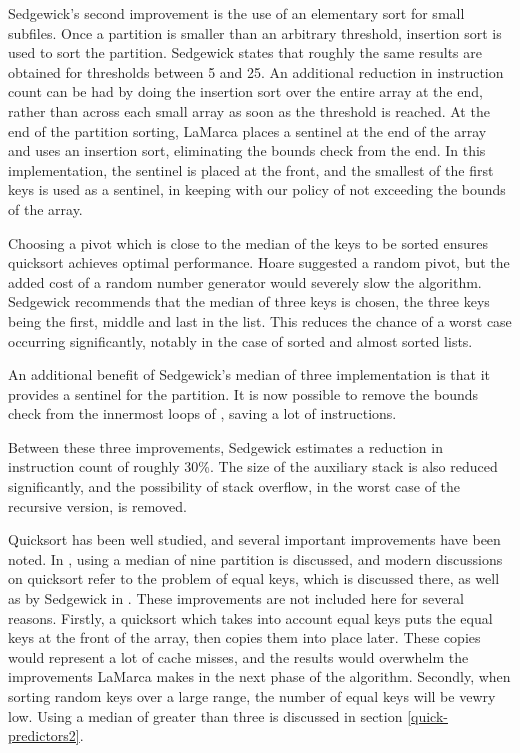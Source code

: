 Sedgewick's second improvement is the use of an elementary sort for small
subfiles.  Once a partition is smaller than an arbitrary threshold, insertion
sort is used to sort the partition. Sedgewick states that roughly the same
results are obtained for thresholds between 5 and 25. An additional reduction in
instruction count can be had by doing the insertion sort over the entire array
at the end, rather than across each small array as soon as the threshold is
reached. At the end of the partition sorting, LaMarca places a sentinel at the
end of the array and uses an insertion sort, eliminating the bounds check from
the end. In this implementation, the sentinel is placed at the front, and the
smallest of the first  keys is used as a sentinel, in keeping
with our policy of not exceeding the bounds of the array.

Choosing a pivot which is close to the median of the keys to be sorted ensures
quicksort achieves optimal performance. Hoare suggested a random pivot, but the
added cost of a random number generator would severely slow the algorithm.
Sedgewick recommends that the median of three keys is chosen, the three keys
being the first, middle and last in the list. This reduces the chance of a worst
case occurring significantly, notably in the case of sorted and almost sorted
lists.

An additional benefit of Sedgewick's median of three implementation is that it
provides a sentinel for the partition. It is now possible to remove the bounds
check from the innermost loops of , saving a lot of instructions.

Between these three improvements, Sedgewick estimates a reduction in
instruction count of roughly 30\%. The size of the auxiliary stack is also
reduced significantly, and the possibility of stack overflow, in the worst case
of the recursive version, is removed.

Quicksort has been well studied, and several important improvements have been
noted. In \cite{BentleyMcIlroy93}, using a median of nine partition is discussed,
and modern discussions on quicksort refer to the problem of equal keys, which is
discussed there, as well as by Sedgewick in \cite{SedgewickBentley02}. These
improvements are not included here for several reasons. Firstly, a quicksort
which takes into account equal keys puts the equal keys at the front of the
array, then copies them into place later. These copies would represent a lot of
cache misses, and the results would overwhelm the improvements LaMarca makes in
the next phase of the algorithm. Secondly, when sorting random keys over a
large range, the number of equal keys will be vewry low. Using a median of
greater than three is discussed in section \ref{quick-predictors2}.

